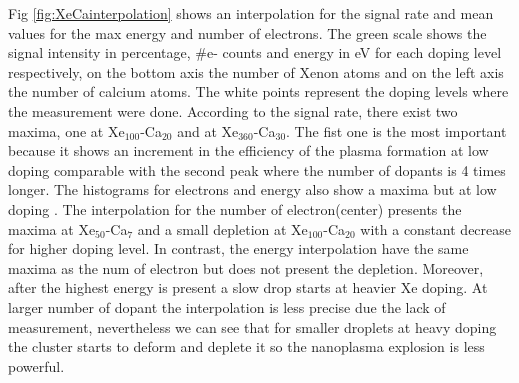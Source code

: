 Fig \ref{fig:XeCainterpolation} shows an interpolation for the signal rate and mean values for the max energy and number of electrons. The green scale shows the signal intensity in percentage, $\#$e- counts and  energy in eV for each doping level respectively, on the bottom axis  the number of Xenon atoms and on the left axis the number of calcium atoms. The white points represent the doping levels where the measurement were done. According to the signal rate, there exist two maxima, one at Xe$_{100}$-Ca$_{20}$ and at Xe$_{360}$-Ca$_{30}$. The fist one is the most important because it shows an increment in the efficiency of the plasma formation at low doping comparable with the second peak where the number of dopants is 4 times longer. The histograms for electrons and energy also show a maxima but at low doping . The interpolation for the number of electron(center) presents the maxima at Xe$_{50}$-Ca$_{7}$ and a small depletion at  Xe$_{100}$-Ca$_{20}$ with a constant decrease for higher doping level. In contrast, the energy interpolation have the same maxima as the num of electron but does not present the depletion. Moreover, after the highest energy is present  a slow drop starts at  heavier Xe doping. At larger number of dopant the interpolation is less precise due the lack of measurement, nevertheless we can see that  for smaller droplets at heavy doping the cluster starts to deform and deplete it so the nanoplasma explosion is  less powerful.




%


